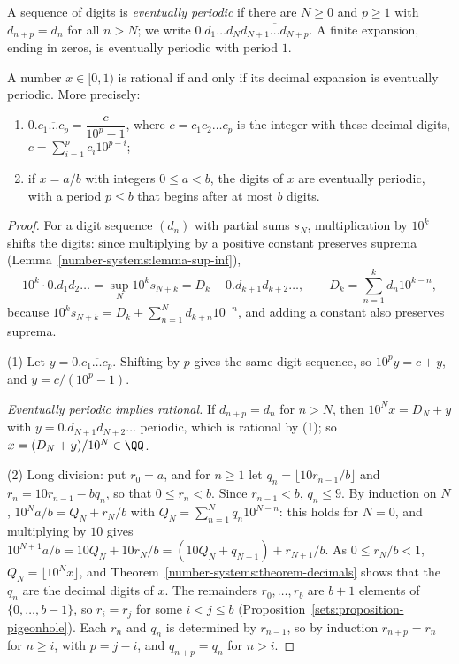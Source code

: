 A sequence of digits is \emph{eventually periodic} if there are $N \geq 0$ and $p \geq 1$ with $d_{n+p} = d_n$ for all $n > N$; we write $0.d_1 \ldots d_N\overline{d_{N+1} \ldots d_{N+p}}$. A finite expansion,
ending in zeros, is eventually periodic with period $1$.

\begin{theorem}\label{number-systems:theorem-periodic-decimals}
A number $x \in [0, 1)$ is rational if and only if its decimal expansion is eventually periodic. More precisely:
\begin{enumerate}
\item $0.\overline{c_1 \ldots c_p} = \dfrac{c}{10^p - 1}$, where $c = c_1c_2\ldots c_p$ is the integer with these decimal digits, $c = \sum_{i=1}^pc_i10^{p-i}$;
\item if $x = a/b$ with integers $0 \leq a < b$, the digits of $x$ are eventually periodic, with a period $p \leq b$ that begins after at most $b$ digits.
\end{enumerate}
\end{theorem}

\begin{proof}
For a digit sequence $(d_n)$ with partial sums $s_N$, multiplication by $10^k$ shifts the digits: since multiplying by a positive constant preserves suprema (Lemma~\ref{number-systems:lemma-sup-inf}),
\[
10^k \cdot 0.d_1d_2\ldots = \sup_N10^ks_{N+k} = D_k + 0.d_{k+1}d_{k+2}\ldots, \qquad D_k = \sum_{n=1}^kd_n10^{k-n},
\]
because $10^ks_{N+k} = D_k + \sum_{n=1}^Nd_{k+n}10^{-n}$, and adding a constant also preserves suprema.

(1) Let $y = 0.\overline{c_1 \ldots c_p}$. Shifting by $p$ gives the same digit sequence, so $10^py = c + y$, and $y = c/(10^p - 1)$.

\emph{Eventually periodic implies rational.} If $d_{n+p} = d_n$ for $n > N$, then $10^Nx = D_N + y$ with $y = 0.d_{N+1}d_{N+2}\ldots$ periodic, which is rational by (1); so $x = (D_N + y)/10^N \in \QQ$.

(2) Long division: put $r_0 = a$, and for $n \geq 1$ let $q_n = \lfloor 10r_{n-1}/b\rfloor$ and $r_n = 10r_{n-1} - bq_n$, so that $0 \leq r_n < b$. Since $r_{n-1} < b$, $q_n \leq 9$. By induction on $N$,
$10^Na/b = Q_N + r_N/b$ with $Q_N = \sum_{n=1}^Nq_n10^{N-n}$: this holds for $N = 0$, and multiplying by $10$ gives $10^{N+1}a/b = 10Q_N + 10r_N/b = (10Q_N + q_{N+1}) + r_{N+1}/b$. As $0 \leq r_N/b < 1$,
$Q_N = \lfloor 10^Nx\rfloor$, and Theorem~\ref{number-systems:theorem-decimals} shows that the $q_n$ are the decimal digits of $x$. The remainders $r_0, \ldots, r_b$ are $b + 1$ elements of $\{0, \ldots, b - 1\}$, so
$r_i = r_j$ for some $i < j \leq b$ (Proposition~\ref{sets:proposition-pigeonhole}). Each $r_n$ and $q_n$ is determined by $r_{n-1}$, so by induction $r_{n+p} = r_n$ for $n \geq i$, with $p = j - i$, and
$q_{n+p} = q_n$ for $n > i$.
\end{proof}

